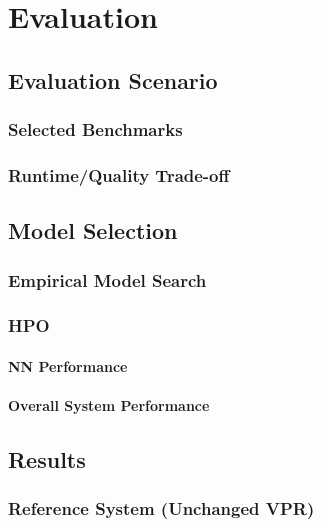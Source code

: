 
\chapter{Evaluation}\label{ch:evaluation}
\glsresetall %

\section{Evaluation Scenario}

\subsection{Selected Benchmarks}

\subsection{Runtime/Quality Trade-off}

\section{Model Selection}

\subsection{Empirical Model Search}

\subsection{\gls{HPO}}

\subsubsection{\gls{NN} Performance}

\subsubsection{Overall System Performance}

\section{Results}

\subsection{Reference System (Unchanged \gls{VPR})}

